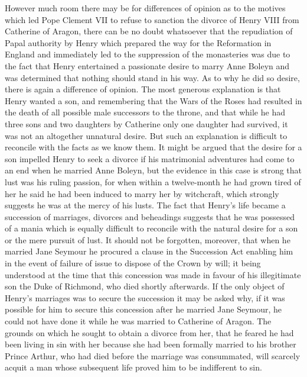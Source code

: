 \documentclass{book}
\begin{document}
However much room there may be for differences of opinion as to the motives which led Pope Clement VII to refuse to sanction the divorce of Henry VIII from Catherine of Aragon, there can be no doubt whatsoever that the repudiation of Papal authority by Henry which prepared the way for the Reformation in England and immediately led to the suppression of the monasteries was due to the fact that Henry entertained a passionate desire to marry Anne Boleyn and was determined that nothing should stand in his way. As to why he did so desire, there is again a difference of opinion. The most generous explanation is that Henry wanted a son, and remembering that the Wars of the Roses had resulted in the death of all possible male successors to the throne, and that while he had three sons and two daughters by Catherine only one daughter had survived, it was not an altogether unnatural desire. But such an explanation is difficult to reconcile with the facts as we know them. It might be argued that the desire for a son impelled Henry to seek a divorce if his matrimonial adventures had come to an end when he married Anne Boleyn, but the evidence in this case is strong that lust was his ruling passion, for when within a twelve-month he had grown tired of her he said he had been induced to marry her by witchcraft, which strongly suggests he was at the mercy of his lusts. The fact that Henry’s life became a succession of marriages, divorces and beheadings suggests that he was possessed of a mania which is equally difficult to reconcile with the natural desire for a son or the mere pursuit of lust. It should not be forgotten, moreover, that when he married Jane Seymour he procured a clause in the Succession Act enabling him in the event of failure of issue to dispose of the Crown by will; it being understood at the time that this concession was made in favour of his illegitimate son the Duke of Richmond, who died shortly afterwards. If the only object of Henry’s marriages was to secure the succession it may be asked why, if it was possible for him to secure this concession after he married Jane Seymour, he could not have done it while he was married to Catherine of Aragon. The grounds on which he sought to obtain a divorce from her, that he feared he had been living in sin with her because she had been formally married to his brother Prince Arthur, who had died before the marriage was consummated, will scarcely acquit a man whose subsequent life proved him to be indifferent to sin.
\end{document}
